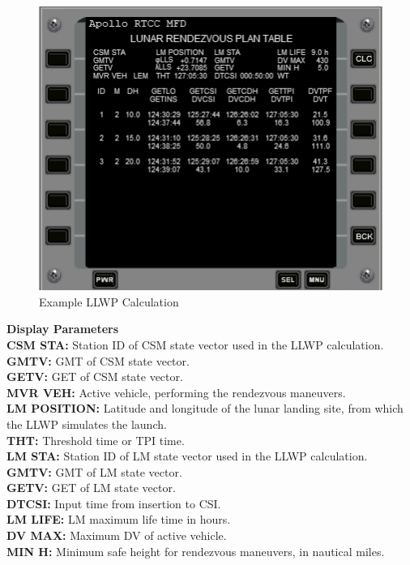 \documentclass[11pt]{article} %
\begin{document}
\begin{figure}[hp]
	\centering
		\includegraphics{./ApolloRTCCMFDFiles/RTCCMFD_LLWP_Display.png}
	\caption{Example LLWP Calculation}
	\label{fig:LLWPDisplay}
\end{figure}
\textbf{Display Parameters}\\

\textbf{CSM STA:} Station ID of CSM state vector used in the LLWP calculation.\\
\textbf{GMTV:} GMT of CSM state vector.\\
\textbf{GETV:} GET of CSM state vector.\\
\textbf{MVR VEH:} Active vehicle, performing the rendezvous maneuvers.\\
\textbf{LM POSITION:} Latitude and longitude of the lunar landing site, from which the LLWP simulates the launch.\\
\textbf{THT:} Threshold time or TPI time.\\
\textbf{LM STA:} Station ID of LM state vector used in the LLWP calculation.\\
\textbf{GMTV:} GMT of LM state vector.\\
\textbf{GETV:} GET of LM state vector.\\
\textbf{DTCSI:} Input time from insertion to CSI.\\
\textbf{LM LIFE:} LM maximum life time in hours.\\
\textbf{DV MAX:} Maximum DV of active vehicle.\\
\textbf{MIN H:} Minimum safe height for rendezvous maneuvers, in nautical miles.\\
\end{document}
